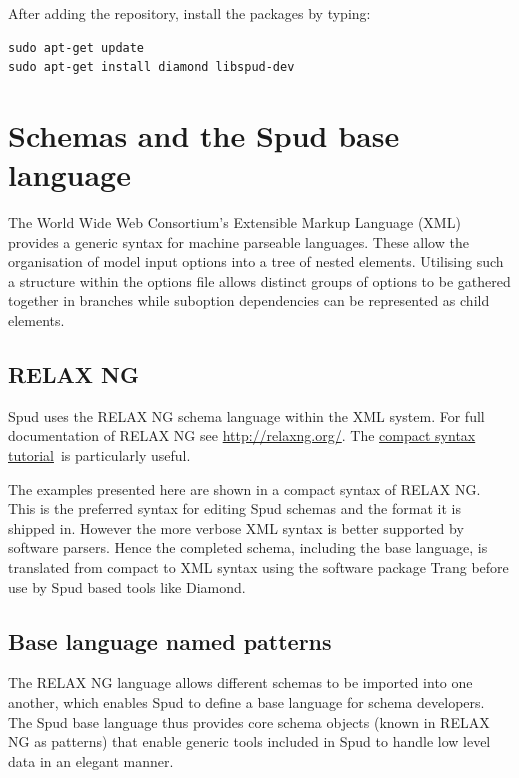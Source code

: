 \documentclass[a4paper, 11pt]{book}
\begin{document}
After adding the repository, install the
packages by typing:

\begin{verbatim}
sudo apt-get update
sudo apt-get install diamond libspud-dev
\end{verbatim}

\chapter{Schemas and the Spud base language}
\lstset{language=rnc}

The World Wide Web Consortium's Extensible Markup Language (XML) provides a
generic syntax for machine parseable languages.  These allow the
organisation of model input options into a tree of nested elements.
Utilising such a structure within the options file allows distinct groups of
options to be gathered together in branches while suboption dependencies can
be represented as child elements.

\section{RELAX NG}

Spud uses the RELAX NG schema language within the XML system. For full
documentation of RELAX NG see \url{http://relaxng.org/}. The
\href{http://relaxng.org/compact-tutorial-20030326.html}{compact syntax
  tutorial}\ is particularly useful.

The examples presented here are shown in a compact syntax of RELAX NG.  This
is the preferred syntax for editing Spud schemas and the format it is
shipped in.  However the more verbose XML syntax is better supported by
software parsers.  Hence the completed schema, including the base language,
is translated from compact to XML syntax using the software package Trang
before use by Spud based tools like Diamond.

\section{Base language named patterns}\label{sec:named_patterns}

The RELAX NG language allows different schemas to be imported into one
another, which enables Spud to define a base language for schema developers.
The Spud base language thus provides core schema objects (known in RELAX NG
as patterns) that enable generic tools included in Spud to handle low level
data in an elegant manner.
\end{document}
